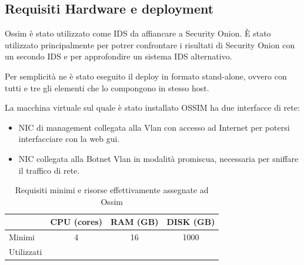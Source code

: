 \subsection*{Requisiti Hardware e deployment}

Ossim è stato utilizzato come IDS da affiancare a Security Onion. È stato utilizzato principalmente per potrer confrontare i risultati di Security Onion con un secondo IDS e per approfondire un sistema  IDS alternativo.

Per semplicità ne è stato eseguito il deploy in formato stand-alone, ovvero con tutti e tre gli elementi che lo compongono in stesso host.

La macchina virtuale sul quale è stato installato OSSIM ha due interfacce di rete: \begin{itemize}
    \item  NIC di management collegata alla Vlan con accesso ad Internet per potersi interfacciare con la web gui.
    \item  NIC collegata alla Botnet Vlan in modalità promiscua, necessaria per sniffare il traffico di rete.
\end{itemize} 


\begin{table}[hbtp]
    \centering
    \begin{tabular}{|l|c|c|c|}
        \hline
        & CPU (cores) & RAM (GB) & DISK (GB) \\
        \hline
        Minimi     & 4 & 16 & 1000   \\
        \hline
        Utilizzati &    &   &  \\
        \hline
    \end{tabular}
    \caption{Requisiti minimi e risorse effettivamente assegnate ad Ossim}
    \label{tab:requisitiHw4}
\end{table}

